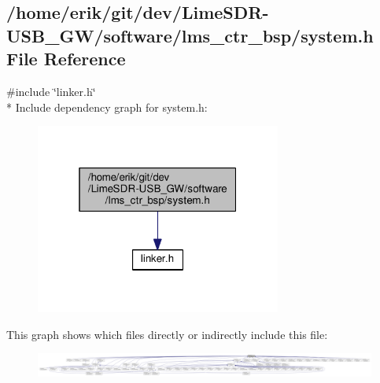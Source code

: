\subsection{/home/erik/git/dev/\+Lime\+S\+D\+R-\/\+U\+S\+B\+\_\+\+G\+W/software/lms\+\_\+ctr\+\_\+bsp/system.h File Reference}
\label{system_8h}
{\ttfamily \#include \char`\"{}linker.\+h\char`\"{}}\\*
Include dependency graph for system.\+h\+:
\nopagebreak
\begin{figure}[H]
\begin{center}
\leavevmode
\includegraphics[width=229pt]{d7/d71/system_8h__incl}
\end{center}
\end{figure}
This graph shows which files directly or indirectly include this file\+:
\nopagebreak
\begin{figure}[H]
\begin{center}
\leavevmode
\includegraphics[width=350pt]{dd/d37/system_8h__dep__incl}
\end{center}
\end{figure}
